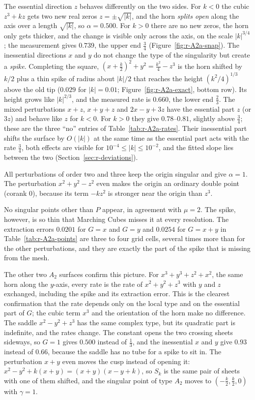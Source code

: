 \documentclass[12pt, a4paper, oneside]{book}
\theoremstyle{plain}
\theoremstyle{definition}
\theoremstyle{remark}
\theoremstyle{definition}
\begin{document}
The essential direction $z$ behaves differently on the two sides. For $k<0$ the cubic $z^3+kz$ gets two new real zeros $z=\pm\sqrt{|k|}$, and the horn \emph{splits open} along the axis over a length $\sqrt{|k|}$, so $\alpha=0.500$. For $k>0$ there are no new zeros, the horn only gets thicker, and the change is visible only across the axis, on the scale $|k|^{3/4}$; the measurement gives $0.739$, the upper end $\tfrac34$ (Figure~\ref{fig:r-A2a-snap}). The inessential directions $x$ and $y$ do not change the type of the singularity but create a \emph{spike}. Completing the square, $(x+\tfrac k2)^2+y^2=\tfrac{k^2}{4}-z^3$ is the horn shifted by $k/2$ plus a thin spike of radius about $|k|/2$ that reaches the height $(k^2/4)^{1/3}$ above the old tip ($0.029$ for $|k|=0.01$; Figure~\ref{fig:r-A2a-exact}, bottom row). Its height grows like $|k|^{2/3}$, and the measured rate is $0.660$, the lower end $\tfrac23$. The mixed perturbations $x+z$, $x+y+z$ and $2x-y+3z$ have the essential part $z$ (or $3z$) and behave like $z$ for $k<0$. For $k>0$ they give $0.78$--$0.81$, slightly above $\tfrac34$; these are the three ``no'' entries of Table~\ref{tab:r-A2a-rates}. Their inessential part shifts the surface by $O(|k|)$ at the same time as the essential part acts with the rate $\tfrac34$, both effects are visible for $10^{-4}\le|k|\le10^{-2}$, and the fitted slope lies between the two (Section~\ref{sec:r-deviations}).

All perturbations of order two and three keep the origin singular and give $\alpha=1$. The perturbation $x^2+y^2-z^2$ even makes the origin an ordinary double point (corank $0$), because its term $-kz^2$ is stronger near the origin than $z^3$.

No singular points other than $P$ appear, in agreement with $\mu=2$. The spike, however, is so thin that Marching Cubes misses it at every resolution. The extraction errors $0.0201$ for $G=x$ and $G=y$ and $0.0254$ for $G=x+y$ in Table~\ref{tab:r-A2a-points} are three to four grid cells, several times more than for the other perturbations, and they are exactly the part of the spike that is missing from the mesh.

The other two $A_2$ surfaces confirm this picture. For $x^3+y^3+z^2+x^2$, the same horn along the $y$-axis, every rate is the rate of $x^2+y^2+z^3$ with $y$ and $z$ exchanged, including the spike and its extraction error. This is the clearest confirmation that the rate depends only on the local type and on the essential part of $G$; the cubic term $x^3$ and the orientation of the horn make no difference. The saddle $x^2-y^2+z^3$ has the same complex type, but its quadratic part is indefinite, and the rates change. The constant opens the two crossing sheets sideways, so $G=1$ gives $0.500$ instead of $\tfrac13$, and the inessential $x$ and $y$ give $0.93$ instead of $0.66$, because the saddle has no tube for a spike to sit in. The perturbation $x+y$ even moves the cusp instead of opening it: $x^2-y^2+k(x+y)=(x+y)(x-y+k)$, so $S_k$ is the same pair of sheets with one of them shifted, and the singular point of type $A_2$ moves to $(-\tfrac k2,\tfrac k2,0)$ with $\gamma=1$.
\clearpage
\end{document}
